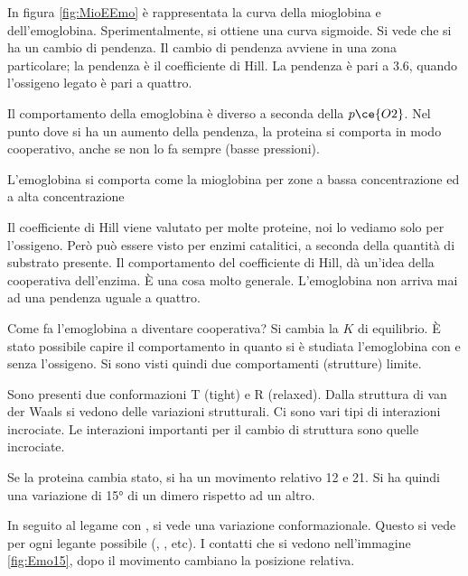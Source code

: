 In figura{} \ref{fig:MioEEmo} è rappresentata la curva della mioglobina e dell'emoglobina.
Sperimentalmente, si ottiene una curva sigmoide. Si vede che si ha
un cambio di pendenza. Il cambio di pendenza avviene in una zona
particolare; la pendenza è il coefficiente di Hill.
La pendenza è pari a 3.6, quando l'ossigeno legato è pari a quattro.

Il comportamento della emoglobina è diverso a seconda della
\(p\ce{O2}\). Nel punto dove si ha un aumento della pendenza, la
proteina si comporta in modo cooperativo, anche se non lo fa sempre
(basse pressioni).

L'emoglobina si comporta come la mioglobina per zone a bassa concentrazione ed a
alta concentrazione

Il coefficiente di Hill viene valutato per molte proteine, noi lo
vediamo solo per l'ossigeno. Però può essere visto per enzimi
catalitici, a seconda della quantità di substrato presente. Il
comportamento del coefficiente di Hill, dà un'idea della cooperativa
dell'enzima. È una cosa molto generale.
L'emoglobina non arriva mai ad una pendenza uguale a quattro.


\clearpage

Come fa l'emoglobina a diventare cooperativa? Si cambia la $K$ di equilibrio.
È stato possibile capire il comportamento in quanto si è studiata
l'emoglobina con e senza l'ossigeno.
Si sono visti quindi due comportamenti (strutture) limite.


Sono presenti due conformazioni T (tight) e R (relaxed). Dalla struttura di
van der Waals si vedono delle variazioni strutturali.
Ci sono vari tipi di interazioni incrociate. Le interazioni importanti per il cambio di struttura sono quelle incrociate.


Se la proteina cambia stato, si ha un movimento relativo \alpha{}1\beta{}2 e \alpha{}2\beta{}1.
Si ha quindi una variazione di 15° di un dimero rispetto ad un altro.


In seguito al legame con , si vede una variazione
conformazionale. Questo si vede per ogni legante possibile (, ,
etc). I contatti che si vedono nell'immagine {}\ref{fig:Emo15}, dopo il
movimento cambiano la posizione relativa.

